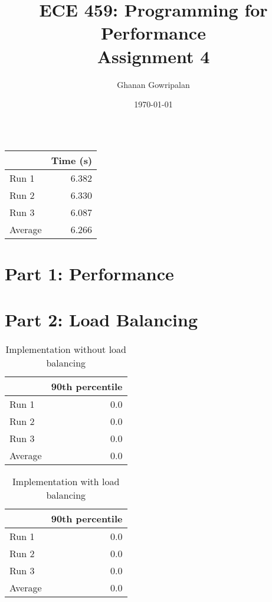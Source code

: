 \documentclass[12pt]{article}
\title{ECE 459: Programming for Performance\\Assignment 4}
\author{Ghanan Gowripalan}
\date{\today}
\begin{document}
\maketitle

\begin{table}[H]
  \centering
  \begin{tabular}{lr}
    & {\bf Time (s)} \\
    \hline
    Run 1 & 6.382 \\
    Run 2 & 6.330 \\
    Run 3 & 6.087 \\
    \hline
    Average & 6.266 \\
  \end{tabular}
  \caption{}
  \label{tbl-originall}
\end{table}


\section*{Part 1: Performance}



\section*{Part 2: Load Balancing}

\begin{table}[H]
  \centering
  \begin{tabular}{lr}
    & {\bf 90th percentile} \\
    \hline
    Run 1 & 0.0 \\
    Run 2 & 0.0 \\
    Run 3 & 0.0 \\
    \hline
    Average & 0.0 \\
  \end{tabular}
  \caption{Implementation without load balancing}
  \label{tbl-part2-originall}
\end{table}


\begin{table}[H]
  \centering
  \begin{tabular}{lr}
    & {\bf 90th percentile} \\
    \hline
    Run 1 & 0.0 \\
    Run 2 & 0.0 \\
    Run 3 & 0.0 \\
    \hline
    Average & 0.0 \\
  \end{tabular}
  \caption{Implementation with load balancing}
  \label{tbl-part2-loadbalance}
\end{table}
\end{document}
